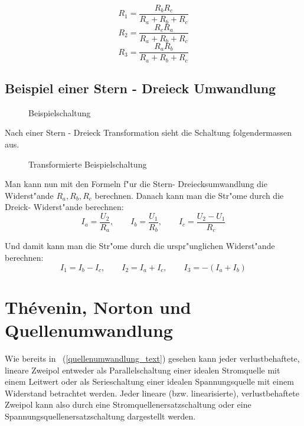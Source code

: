 \documentclass[german, 10pt, a4paper, headsepline]{scrreprt}
\theoremstyle{remark}
\begin{document}
\begin{displaymath}
	R_1 = \frac{R_bR_c}{R_a+R_b+R_c}
\end{displaymath}
\begin{displaymath}
	R_2 = \frac{R_cR_a}{R_a+R_b+R_c}
\end{displaymath}
\begin{displaymath}
	R_3 = \frac{R_aR_b}{R_a+R_b+R_c}
\end{displaymath}

\subsection{Beispiel einer Stern - Dreieck Umwandlung}

\begin{figure}[hbt]
 
 \centerline{\box\graph}
 \caption{Beispielschaltung}
\end{figure}

Nach einer Stern - Dreieck Transformation sieht die Schaltung folgendermassen aus.
\begin{figure}[hbt]
 
 \centerline{\box\graph}
 \caption{Transformierte Beispielschaltung}
\end{figure}

Man kann nun mit den Formeln f"ur die Stern- Dreiecksumwandlung die Widerst"ande $R_a, R_b, R_c$ berechnen. Danach kann man die Str"ome durch die Dreick- Widerst"ande berechnen:
\begin{displaymath}
	I_a = \frac{U_2}{R_a}, \qquad I_b = \frac{U_1}{R_b}, \qquad I_c = \frac{U_2 - U_1}{R_c}
\end{displaymath}

Und damit kann man die Str"ome durch die urspr"unglichen Widerst"ande berechnen:
\begin{displaymath}
	I_1 = I_b - I_c, \qquad I_2 = I_a + I_c, \qquad I_3 = -(I_a + I_b)
\end{displaymath}


\section{Th\'evenin, Norton und Quellenumwandlung}


Wie bereits in ~(\ref{quellenumwandlung_text}) gesehen kann jeder verlustbehaftete, lineare Zweipol entweder als Parallelschaltung einer idealen Stromquelle mit einem Leitwert oder als Serieschaltung einer idealen Spannungsquelle mit einem Widerstand betrachtet werden. Jeder lineare (bzw. linearisierte), verlustbehaftete Zweipol kann also durch eine Stromquellenersatzschaltung oder eine Spannungsquellenersatzschaltung dargestellt werden.\\
\end{document}

